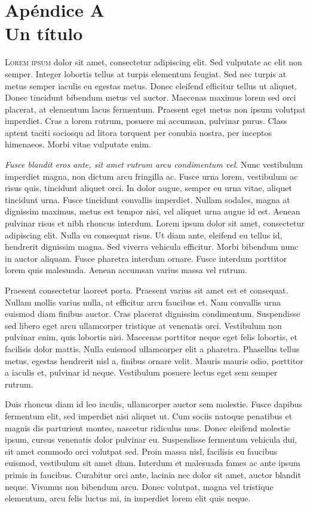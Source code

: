 \chapter*{Apéndice A\\Un título}

\noindent\textsc{Lorem ipsum} dolor sit amet, consectetur adipiscing elit. Sed vulputate ac elit non semper. Integer lobortis tellus at turpis elementum feugiat. Sed nec turpis at metus semper iaculis eu egestas metus. Donec eleifend efficitur tellus ut aliquet. Donec tincidunt bibendum metus vel auctor. Maecenas maximus lorem sed orci placerat, at elementum lacus fermentum. Praesent eget metus non ipsum volutpat imperdiet. Cras a lorem rutrum, posuere mi accumsan, pulvinar purus. Class aptent taciti sociosqu ad litora torquent per conubia nostra, per inceptos himenaeos. Morbi vitae vulputate enim.

\emph{Fusce blandit eros ante, sit amet rutrum arcu condimentum vel}. Nunc vestibulum imperdiet magna, non dictum arcu fringilla ac. Fusce urna lorem, vestibulum ac risus quis, tincidunt aliquet orci. In dolor augue, semper eu urna vitae, aliquet tincidunt urna. Fusce tincidunt convallis imperdiet. Nullam sodales, magna at dignissim maximus, metus est tempor nisi, vel aliquet urna augue id est. Aenean pulvinar risus et nibh rhoncus interdum. Lorem ipsum dolor sit amet, consectetur adipiscing elit. Nulla eu consequat risus. Ut diam ante, eleifend eu tellus id, hendrerit dignissim magna. Sed viverra vehicula efficitur. Morbi bibendum nunc in auctor aliquam. Fusce pharetra interdum ornare. Fusce interdum porttitor lorem quis malesuada. Aenean accumsan varius massa vel rutrum.

Praesent consectetur laoreet porta. Praesent varius sit amet est et consequat. Nullam mollis varius nulla, at efficitur arcu faucibus et. Nam convallis urna euismod diam finibus auctor. Cras placerat dignissim condimentum. Suspendisse sed libero eget arcu ullamcorper tristique at venenatis orci. Vestibulum non pulvinar enim, quis lobortis nisi. Maecenas porttitor neque eget felis lobortis, et facilisis dolor mattis. Nulla euismod ullamcorper elit a pharetra. Phasellus tellus metus, egestas hendrerit nisl a, finibus ornare velit. Mauris mauris odio, porttitor a iaculis et, pulvinar id neque. Vestibulum posuere lectus eget sem semper rutrum.

Duis rhoncus diam id leo iaculis, ullamcorper auctor sem molestie. Fusce dapibus fermentum elit, sed imperdiet nisi aliquet ut. Cum sociis natoque penatibus et magnis dis parturient montes, nascetur ridiculus mus. Donec eleifend molestie ipsum, cursus venenatis dolor pulvinar eu. Suspendisse fermentum vehicula dui, sit amet commodo orci volutpat sed. Proin massa nisl, facilisis eu faucibus euismod, vestibulum sit amet diam. Interdum et malesuada fames ac ante ipsum primis in faucibus. Curabitur orci ante, lacinia nec dolor sit amet, auctor blandit neque. Vivamus non bibendum arcu. Donec volutpat, magna vel tristique elementum, arcu felis luctus mi, in imperdiet lorem elit quis neque.

